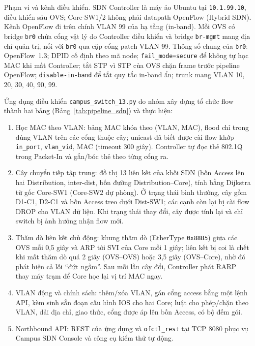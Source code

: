 Phạm vi và kênh điều khiển. SDN Controller là máy ảo Ubuntu tại \texttt{10.1.99.10}, điều khiển sáu OVS; Core-SW1/2 không phải datapath OpenFlow (Hybrid SDN). Kênh OpenFlow đi trên chính VLAN 99 của hạ tầng (in-band). Mỗi OVS có bridge \texttt{br0} chứa cổng vật lý do Controller điều khiển và bridge \texttt{br-mgmt} mang địa chỉ quản trị, nối với \texttt{br0} qua cặp cổng patch VLAN 99. Thông số chung của \texttt{br0}: OpenFlow~1.3; DPID cố định theo mã node; \texttt{fail\_mode=secure} để không tự học MAC khi mất Controller; tắt STP vì STP của OVS chặn frame trước pipeline OpenFlow; \texttt{disable-in-band} để tắt quy tắc in-band ẩn; trunk mang VLAN 10, 20, 30, 40, 90, 99.

Ứng dụng điều khiển \texttt{campus\_switch\_13.py} do nhóm xây dựng tổ chức flow thành hai bảng (Bảng~\ref{tab:pipeline_sdn}) và thực hiện:
\begin{enumerate}
    \item Học MAC theo VLAN: bảng MAC khóa theo (VLAN, MAC), flood chỉ trong đúng VLAN trên các cổng thuộc cây; unicast đã biết được cài flow khớp \texttt{in\_port}, \texttt{vlan\_vid}, MAC (timeout 300 giây). Controller tự đọc thẻ 802.1Q trong Packet-In và gắn/bóc thẻ theo từng cổng ra.
    \item Cây chuyển tiếp tập trung: đồ thị 13 liên kết của khối SDN (bốn Access lên hai Distribution, inter-dist, bốn đường Distribution--Core), tính bằng Dijkstra từ gốc Core-SW1 (Core-SW2 dự phòng). Ở trạng thái bình thường, cây gồm D1-C1, D2-C1 và bốn Access treo dưới Dist-SW1; các cạnh còn lại bị cài flow DROP cho VLAN dữ liệu. Khi trạng thái thay đổi, cây được tính lại và chỉ switch bị ảnh hưởng nhận flow mới.
    \item Thăm dò liên kết chủ động: khung thăm dò (EtherType \texttt{0x88B5}) giữa các OVS mỗi 0,5 giây và ARP tới SVI của Core mỗi 1 giây; liên kết bị coi là chết khi mất thăm dò quá 2 giây (OVS--OVS) hoặc 3,5 giây (OVS--Core), nhờ đó phát hiện cả lỗi ``đứt ngầm''. Sau mỗi lần cây đổi, Controller phát RARP thay máy trạm để Core học lại vị trí MAC ngay.
    \item VLAN động và chính sách: thêm/xóa VLAN, gán cổng access bằng một lệnh API, kèm sinh sẵn đoạn cấu hình IOS cho hai Core; luật cho phép/chặn theo VLAN, dải địa chỉ, giao thức, cổng được áp lên bốn Access, có bộ đếm gói.
    \item Northbound API: REST của ứng dụng và \texttt{ofctl\_rest} tại TCP 8080 phục vụ Campus SDN Console và công cụ kiểm thử tự động.
\end{enumerate}

